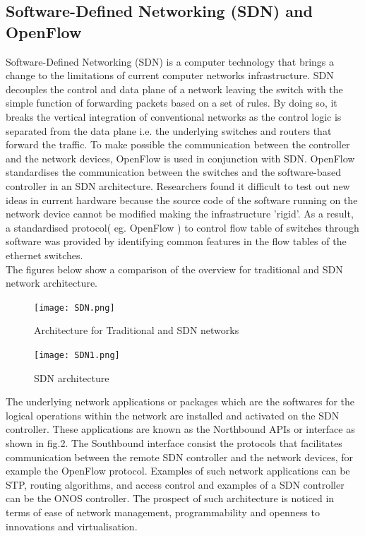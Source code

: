 \documentclass{article}
\begin{document}
\subsection{Software-Defined Networking (SDN) and OpenFlow} 
Software-Defined Networking (SDN) is a computer technology that brings a change to the limitations of current computer networks infrastructure. SDN\cite{6587999} decouples the control and data plane of a network leaving the switch with the simple function of forwarding packets based on a set of rules. By doing so, it breaks the vertical integration of conventional networks as the control logic is separated from the data plane i.e. the underlying switches and routers that forward the traffic\cite{6994333}. To make possible the communication between the controller and the network devices, OpenFlow\cite{6587999} is used in conjunction with SDN. OpenFlow standardises the communication between the switches and the software-based controller in an SDN architecture. Researchers found it difficult to test out new ideas in current hardware because the source code of the software running on the network device cannot be modified making the infrastructure 'rigid'. As a result, a standardised protocol( eg. OpenFlow ) to control flow table of switches through software was provided by identifying common features in the flow tables of the ethernet switches\cite{6587999}.\\The figures below show a comparison of the overview for traditional  and SDN network architecture.\\
	\begin{figure}[h]
        		\centering
		\small
        		\texttt{[image: SDN.png]}
        		\caption{Architecture for Traditional and SDN networks}
        		\label{fig:SDN1}
	\end{figure}
    
	\newpage
    	\begin{figure}[h]
        		\centering
		\small
        		\texttt{[image: SDN1.png]}
        		\caption{SDN architecture}
       		 \label{fig:SDN2}
    	\end{figure} 
The underlying network applications or packages which are the softwares for the logical operations within the network are installed and activated on the SDN controller. These applications are known as the Northbound APIs or interface as shown in fig.2. The Southbound interface consist the protocols that facilitates communication between the remote SDN controller and the network devices, for example the OpenFlow\cite{10220519} protocol. Examples of such network applications can be STP, routing algorithms, and access control and examples of a SDN controller can be the ONOS controller. The prospect of such architecture is noticed in terms of ease of network management, programmability and openness to innovations and virtualisation.
\end{document}
